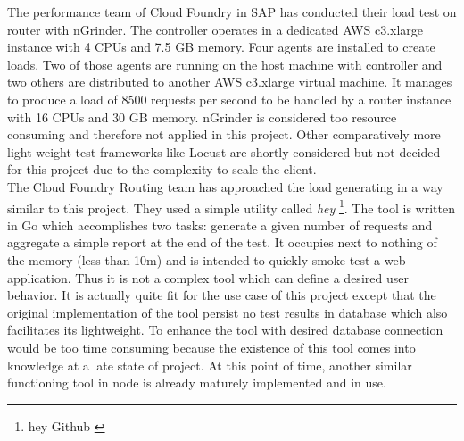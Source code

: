 The performance team of Cloud Foundry in SAP has conducted their load test on router with nGrinder. The controller operates in a dedicated AWS c3.xlarge instance with 4 CPUs and 7.5 GB memory. Four agents are installed to create loads. Two of those agents are running on the host machine with controller and two others are distributed to another AWS c3.xlarge virtual machine. It manages to produce a load of 8500 requests per second to be handled by a router instance with 16 CPUs and 30 GB memory. nGrinder is considered too resource consuming and therefore not applied in this project. Other comparatively more light-weight test frameworks like Locust are shortly considered but not decided for this project due to the complexity to scale the client.\\
The Cloud Foundry Routing team has approached the load generating in a way similar to this project. They used a simple utility called \textit{hey} \footnote{hey Github \cite{Hey}}. The tool is written in Go which accomplishes two tasks: generate a given number of requests and aggregate a simple report at the end of the test. It occupies next to nothing of the memory (less than 10m) and is intended to quickly smoke-test a web-application. Thus it is not a complex tool which can define a desired user behavior. It is actually quite fit for the use case of this project except that the original implementation of the tool persist no test results in database which also facilitates its lightweight. To enhance the tool with desired database connection would be too time consuming because the existence of this tool comes into knowledge at a late state of project. At this point of time, another similar functioning tool in node is already maturely implemented and in use.\\    





  
